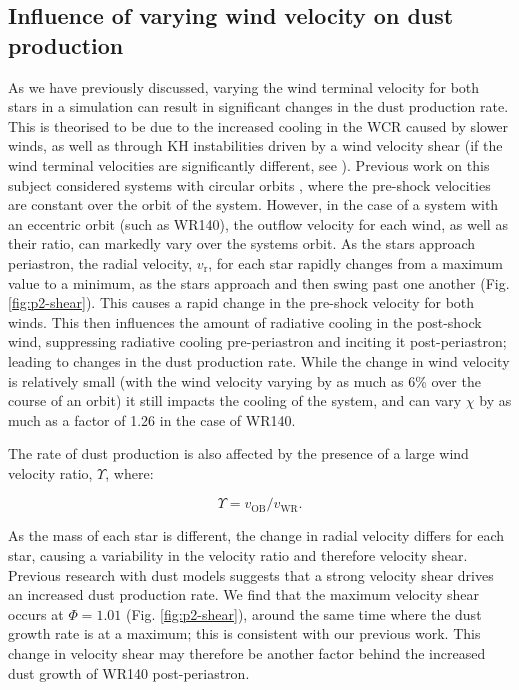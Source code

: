 \documentclass[fleqn,usenatbib]{mnras}
\newcommand{\rms}[1]{\ensuremath{_{\text{#1}}}}
\begin{document}
\subsection{Influence of varying wind velocity on dust production}

As we have previously discussed, varying the wind terminal velocity for both stars in a simulation can result in significant changes in the dust production rate.
This is theorised to be due to the increased cooling in the WCR caused by slower winds, as well as through KH instabilities driven by a wind velocity shear (if the wind terminal velocities are significantly different, see \cite{stevens_colliding_1992}).
Previous work on this subject considered systems with circular orbits \citep{eatsonExplorationDustGrain2022}, where the pre-shock velocities are constant over the orbit of the system.
However, in the case of a system with an eccentric orbit (such as WR140), the outflow velocity for each wind, as well as their ratio, can markedly vary over the systems orbit.
As the stars approach periastron, the radial velocity, $v\rms{r}$, for each star rapidly changes from a maximum value to a minimum, as the stars approach and then swing past one another (Fig. \ref{fig:p2-shear}).
This causes a rapid change in the pre-shock velocity for both winds.
This then influences the amount of radiative cooling in the post-shock wind, suppressing radiative cooling pre-periastron and inciting it post-periastron; leading to changes in the dust production rate. 
While the change in wind velocity is relatively small (with the wind velocity varying by as much as 6\% over the course of an orbit) it still impacts the cooling of the system, and can vary $\chi$ by as much as a factor of 1.26 in the case of WR140.

The rate of dust production is also affected by the presence of a large wind velocity ratio, $\Upsilon$, where:

\begin{equation}
  \Upsilon = v\rms{OB} / v\rms{WR} .
\end{equation}

\noindent
As the mass of each star is different, the change in radial velocity differs for each star, causing a variability in the velocity ratio and therefore velocity shear.
Previous research with dust models suggests that a strong velocity shear drives an increased dust production rate.
We find that the maximum velocity shear occurs at $\Phi = 1.01$ (Fig. \ref{fig:p2-shear}), around the same time where the dust growth rate is at a maximum; this is consistent with our previous work.
This change in velocity shear may therefore be another factor behind the increased dust growth of WR140 post-periastron.
\end{document}
